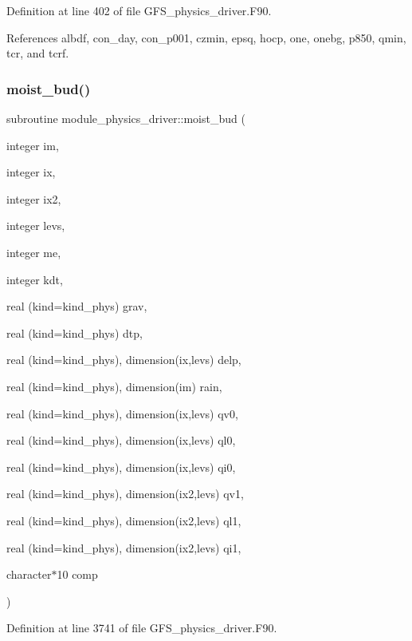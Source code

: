 Definition at line 402 of file G\+F\+S\+\_\+physics\+\_\+driver.\+F90.



References albdf, con\+\_\+day, con\+\_\+p001, czmin, epsq, hocp, one, onebg, p850, qmin, tcr, and tcrf.

\mbox{\label{namespacemodule__physics__driver_ab6908356cf617061321a704625ba036d}} 
\subsubsection{moist\+\_\+bud()}
{\footnotesize\ttfamily subroutine module\+\_\+physics\+\_\+driver\+::moist\+\_\+bud (\begin{DoxyParamCaption}\item[{integer}]{im,  }\item[{integer}]{ix,  }\item[{integer}]{ix2,  }\item[{integer}]{levs,  }\item[{integer}]{me,  }\item[{integer}]{kdt,  }\item[{real (kind=kind\+\_\+phys)}]{grav,  }\item[{real (kind=kind\+\_\+phys)}]{dtp,  }\item[{real (kind=kind\+\_\+phys), dimension(ix,levs)}]{delp,  }\item[{real (kind=kind\+\_\+phys), dimension(im)}]{rain,  }\item[{real (kind=kind\+\_\+phys), dimension(ix,levs)}]{qv0,  }\item[{real (kind=kind\+\_\+phys), dimension(ix,levs)}]{ql0,  }\item[{real (kind=kind\+\_\+phys), dimension(ix,levs)}]{qi0,  }\item[{real (kind=kind\+\_\+phys), dimension(ix2,levs)}]{qv1,  }\item[{real (kind=kind\+\_\+phys), dimension(ix2,levs)}]{ql1,  }\item[{real (kind=kind\+\_\+phys), dimension(ix2,levs)}]{qi1,  }\item[{character$\ast$10}]{comp }\end{DoxyParamCaption})}



Definition at line 3741 of file G\+F\+S\+\_\+physics\+\_\+driver.\+F90.



